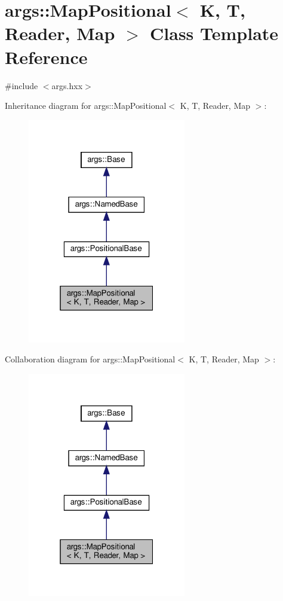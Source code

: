 \hypertarget{classargs_1_1_map_positional}{}\section{args\+:\+:Map\+Positional$<$ K, T, Reader, Map $>$ Class Template Reference}
\label{classargs_1_1_map_positional}


{\ttfamily \#include $<$args.\+hxx$>$}



Inheritance diagram for args\+:\+:Map\+Positional$<$ K, T, Reader, Map $>$\+:\nopagebreak
\begin{figure}[H]
\begin{center}
\leavevmode
\includegraphics[width=196pt]{classargs_1_1_map_positional__inherit__graph}
\end{center}
\end{figure}


Collaboration diagram for args\+:\+:Map\+Positional$<$ K, T, Reader, Map $>$\+:\nopagebreak
\begin{figure}[H]
\begin{center}
\leavevmode
\includegraphics[width=196pt]{classargs_1_1_map_positional__coll__graph}
\end{center}
\end{figure}
